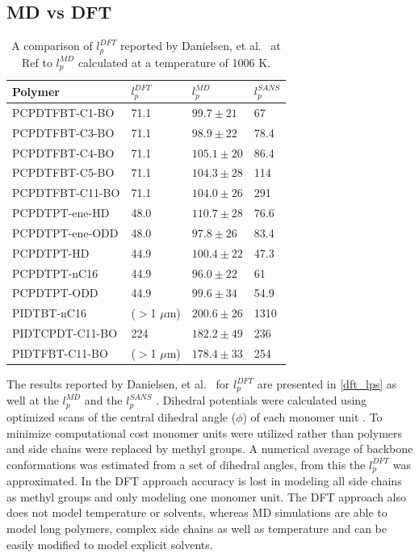 \subsection{MD vs DFT}
\begin{table}[ht]
    \centering
    \begin{tabular}{l|l|ll}
         \textbf{Polymer} & \textbf{$l_p^{DFT}$}& \textbf{$l_p^{MD}$} &\textbf{$l_p^{SANS}$}\\
         \hline
         PCPDTFBT-C1-BO     & 71.1              &   $99.7  \pm 21$ &67\\
         PCPDTFBT-C3-BO     & 71.1              &   $98.9  \pm 22$ &78.4   \\
         PCPDTFBT-C4-BO     & 71.1              &   $105.1 \pm 20$ &86.4   \\
         PCPDTFBT-C5-BO     & 71.1              &   $104.3 \pm 28$ &114\\
         PCPDTFBT-C11-BO    & 71.1              &   $104.0 \pm 26$ &291\\
         PCPDTPT-ene-HD     & 48.0              &   $110.7 \pm 28$ &76.6   \\
         PCPDTPT-ene-ODD    & 48.0              &   $97.8 \pm 26$ &83.4   \\
         PCPDTPT-HD         & 44.9              &   $100.4 \pm 22$ &47.3   \\
         PCPDTPT-nC16       & 44.9              &   $96.0 \pm  22$ &61     \\
         PCPDTPT-ODD        & 44.9              &   $99.6 \pm 34$ &54.9   \\
         PIDTBT-nC16        & ($>$1 \(\mu\)m)   &   $200.6 \pm 26$ &1310   \\
         PIDTCPDT-C11-BO    & 224               &   $182.2 \pm 49$ &236\\
         PIDTFBT-C11-BO     & ($>$1 \(\mu\)m)   &   $178.4 \pm 33$ &254\\
    \end{tabular}
    \caption{A comparison of $l_p^{DFT}$ reported by Danielsen, et al.~ at Ref \citep{danielsen_chain_2022} to $l_p^{MD}$ calculated at a temperature of 1006 K.}
    \label{dft_lps}
\end{table}
The results reported by Danielsen, et al.~ for $l_p^{DFT}$ are presented in \autoref{dft_lps} as well at the $l_p^{MD}$ and the $l_p^{SANS}$ \citep{danielsen_chain_2022}. Dihedral potentials were calculated using optimized scans of the central dihedral angle ($\phi$) of each monomer unit \citep{milner}. To minimize computational cost monomer units were utilized rather than polymers and side chains were replaced by methyl groups. A numerical average of backbone conformations was estimated from a set of dihedral angles, from this the $l_p^{DFT}$ was approximated. In the DFT approach accuracy is lost in modeling all side chains as methyl groups and only modeling one monomer unit. The DFT approach also does not model temperature or solvents, whereas MD simulations are able to model long polymers, complex side chains as well as temperature and can be easily modified to model explicit solvents. 

